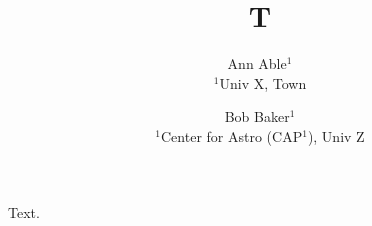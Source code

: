 \documentclass{article}
\begin{document}
\title{T}
\author{Ann Able$^{1}$ \\ $^1$Univ X, Town \and Bob Baker$^{1}$ \\ $^1$Center for Astro (CAP$^1$), Univ Z}
\maketitle
Text.
\end{document}
